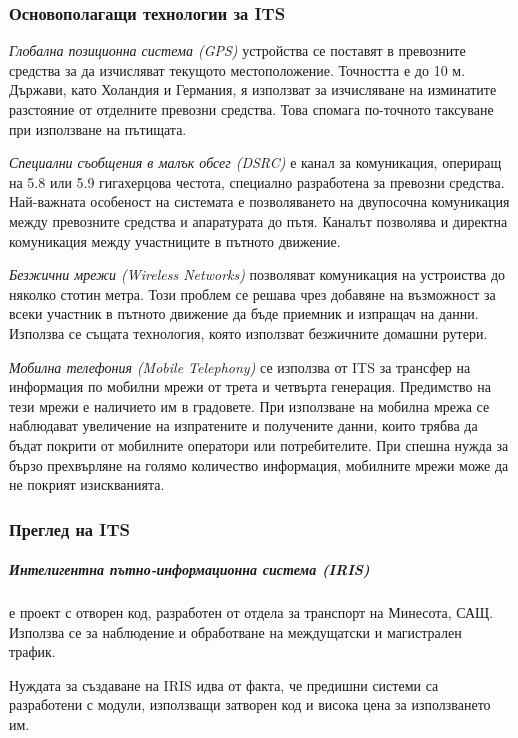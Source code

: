 	  \subsubsection{Основополагащи технологии за \ac{ITS}}
	  	
	  	\emph{Глобална позиционна система (GPS)} устройства се поставят в превозните средства
	  	за да изчисляват текущото местоположение. Точността е до 10 м. Държави, като Холандия и Германия,
	  	я използват за изчисляване на изминатите разстояние от отделните превозни средства. Това
	  	спомага по-точното таксуване при използване на пътищата.
	  	
			\emph{Специални съобщения в малък обсег (DSRC)}	е канал за комуникация, опериращ на 5.8 или 5.9 гигахерцова честота,
			специално разработена за превозни средства. Най-важната особеност на системата е позволяването на двупосочна комуникация
			между превозните средства и апаратурата до пътя. Каналът позволява и директна комуникация между участниците в пътното движение.
			
			\emph{Безжични мрежи (Wireless Networks)} позволяват комуникация на устроиства до няколко стотин метра. Този проблем
			се решава чрез добавяне на възможност за всеки участник в пътното движение да бъде приемник и изпращач на данни. Използва се същата
			технология, която използват безжичните домашни рутери. 
	  
	  	\emph{Мобилна телефония (Mobile Telephony)} се използва от \ac{ITS} за трансфер на информация по
	  	мобилни мрежи от трета и четвърта генерация. Предимство на тези мрежи е наличието им в градовете.
	  	При използване на мобилна мрежа се наблюдават увеличение на изпратените и получените данни,
	  	които трябва да бъдат покрити от мобилните оператори или потребителите. При спешна нужда
	  	за бързо прехвърляне на голямо количество информация, мобилните мрежи може да не покрият изискванията.	  		  	
	    
	  \subsubsection{Преглед на \ac{ITS}}
	  	  	
	  	\subparagraph{\emph{Интелигентна пътно-информационна система (IRIS)}} е проект с отворен код, 
	  	разработен от отдела за транспорт на Минесота, САЩ. 
	  	Използва се за наблюдение и обработване на  междущатски и магистрален трафик.	  	
	  	
	  	Нуждата за създаване на IRIS идва от факта, че предишни системи са разработени
	  	с модули, използващи затворен код и висока цена за използването им. \cite{Darter}
	  	
